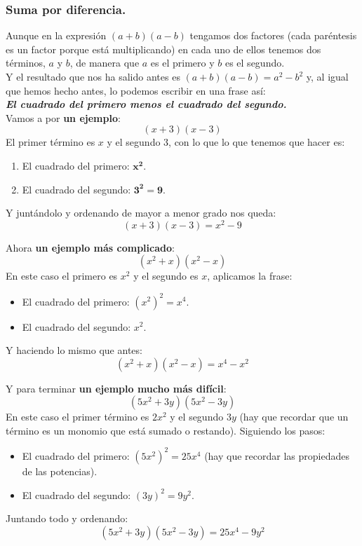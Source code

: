 \documentclass[a4paper,11pt,answers]{exam}
\begin{document}
  \subsubsection{Suma por diferencia.}
  Aunque en la expresión $(a+b)(a-b)$ tengamos dos factores (cada paréntesis es un factor porque está multiplicando) en cada uno de ellos tenemos dos términos, $a$ y $b$, de manera que $a$ es el primero y $b$ es el segundo.\\

  Y el resultado que nos ha salido antes es $(a+b)(a-b) = a^2 - b^2$ y, al igual que hemos hecho antes, lo podemos escribir en una frase así:\\
  \textbf{\emph{El cuadrado del primero menos el cuadrado del segundo.}}\\

  Vamos a por \textbf{un ejemplo}:
  \[(x+3)(x - 3)\]
  El primer término es $x$ y el segundo $3$, con lo que lo que tenemos que hacer es:
  \begin{enumerate}
  \item El cuadrado del primero: $\boldsymbol{x^2}$.
  \item El cuadrado del segundo: $\boldsymbol{3^2 = 9}$.
  \end{enumerate}
  Y juntándolo y ordenando de mayor a menor grado nos queda:
  \[(x+3)(x-3) = x^2 - 9\]

  Ahora \textbf{un ejemplo más complicado}:
  \[(x^2+ x)(x^2 - x)\]
  En este caso el primero es $x^2$ y el segundo es $x$, aplicamos la frase:
  \begin{itemize}
  \item El cuadrado del primero: $\left(x^2\right)^2 = x^4$.
  \item El cuadrado del segundo: $x^2$.
  \end{itemize}
  Y haciendo lo mismo que antes:
  \[(x^2 + x)(x^2 - x) = x^4 - x^2\]

  Y para terminar \textbf{un ejemplo mucho más difícil}:
  \[(5x^2 + 3y)(5x^2 - 3y)\]
  En este caso el primer término es $2x^2$ y el segundo $3y$ (hay que recordar que un término es un monomio que está sumado o restando). Siguiendo los pasos:
  \begin{itemize}
  \item El cuadrado del primero: $\left(5x^2\right)^2 = 25x^4$ (hay que recordar las propiedades de las potencias).
  \item El cuadrado del segundo: $(3y)^2 = 9y^2$.
  \end{itemize}
  Juntando todo y ordenando:
  \[(5x^2 + 3y)(5x^2 - 3y) = 25x^4 - 9y^2\]
\end{document}

